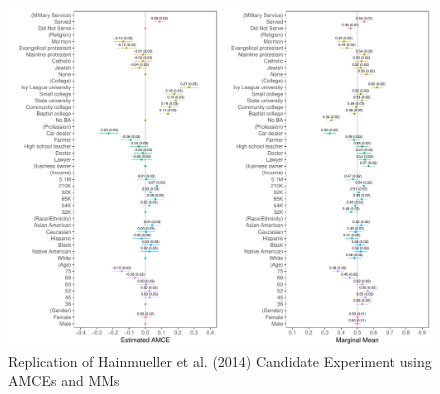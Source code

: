 \documentclass[a4paper,12pt]{article}\usepackage[]{graphicx}\usepackage[]{color}
\makeatletter
\def\maxwidth{ %
  \ifdim\Gin@nat@width>\linewidth
    \linewidth
  \else
    \Gin@nat@width
  \fi
}
\newenvironment{knitrout}{}{} %
\makeatother
\begin{document}
\begin{knitrout}
\color{fgcolor}\begin{figure}
\includegraphics[width=\maxwidth]{figure/hainmueller_candidate_replication-1} \caption[Replication of Hainmueller et al]{Replication of Hainmueller et al. (2014) Candidate Experiment using AMCEs and MMs}\label{fig:hainmueller_candidate_replication}
\end{figure}


\end{knitrout}
\end{document}
